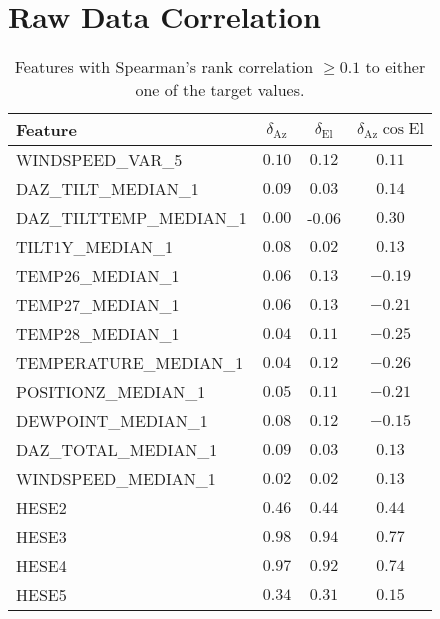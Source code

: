 \section{Raw Data Correlation}
\begin{table}[!htbp]
    \centering
    \caption{Features with Spearman's rank correlation $\geq 0.1$ to either one of the target values.}
    \begin{tabular}{lccc}
        \toprule
        Feature &  $\delta_{\text{Az}}$ &  $\delta_{\text{El}}$ &  $\delta_{\text{Az}}\cos{\text{El}}$ \\
        \midrule
        WINDSPEED\_VAR\_5        &      $0.10$ &      $0.12$ &               $0.11$ \\
        DAZ\_TILT\_MEDIAN\_1      &      $0.09$ &      $0.03$ &               $0.14$ \\
        DAZ\_TILTTEMP\_MEDIAN\_1  &      $0.00$ &     -$0.06$ &               $0.30$ \\
        TILT1Y\_MEDIAN\_1        &      $0.08$ &      $0.02$ &               $0.13$ \\
        TEMP26\_MEDIAN\_1        &      $0.06$ &      $0.13$ &              $-0.19$ \\
        TEMP27\_MEDIAN\_1        &      $0.06$ &      $0.13$ &              $-0.21$ \\
        TEMP28\_MEDIAN\_1        &      $0.04$ &      $0.11$ &              $-0.25$ \\
        TEMPERATURE\_MEDIAN\_1   &      $0.04$ &      $0.12$ &              $-0.26$ \\
        POSITIONZ\_MEDIAN\_1     &      $0.05$ &      $0.11$ &              $-0.21$ \\
        DEWPOINT\_MEDIAN\_1      &      $0.08$ &      $0.12$ &              $-0.15$ \\
        DAZ\_TOTAL\_MEDIAN\_1     &      $0.09$ &      $0.03$ &               $0.13$ \\
        WINDSPEED\_MEDIAN\_1     &      $0.02$ &      $0.02$ &               $0.13$ \\
        HESE2                  &      $0.46$ &      $0.44$ &               $0.44$ \\
        HESE3                  &      $0.98$ &      $0.94$ &               $0.77$ \\
        HESE4                  &      $0.97$ &      $0.92$ &               $0.74$ \\
        HESE5                  &      $0.34$ &      $0.31$ &               $0.15$ \\

\end{tabular}
\end{table}
